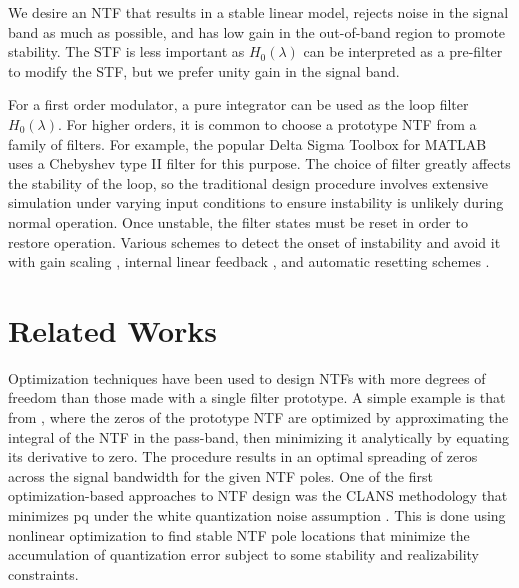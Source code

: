 We desire an \gls{NTF} that results in a stable linear model, rejects noise in the signal band as much as possible, and has low gain in the out-of-band region to promote stability. The \gls{STF} is less important as $H_0(\lambda)$ can be interpreted as a pre-filter to modify the \gls{STF}, but we prefer unity gain in the signal band.

For a first order modulator, a pure integrator can be used as the loop filter $H_0(\lambda)$. For higher orders, it is common to choose a prototype \gls{NTF} from a family of filters. For example, the popular Delta Sigma Toolbox for MATLAB \cite[Appx. B]{Schreier1997} uses a Chebyshev type II filter for this purpose. The choice of filter greatly affects the stability of the loop, so the traditional design procedure involves extensive simulation under varying input conditions to ensure instability is unlikely during normal operation. Once unstable, the filter states must be reset in order to restore operation. Various schemes to detect the onset of instability \cite{Wong2004} and avoid it with gain scaling \cite{Sooch1989}, internal linear feedback \cite{Moussavi1994}, and automatic resetting schemes \cite{Eynde1991}.

\section{Related Works}
\label{sec:in-rw}

Optimization techniques have been used to design \gls{NTF}s with more degrees of freedom than those made with a single filter prototype. A simple example is that from \cite[Sec. 4.3]{Schreier1997}, where the zeros of the prototype \gls{NTF} are optimized by approximating the integral of the \gls{NTF} in the pass-band, then minimizing it analytically by equating its derivative to zero. The procedure results in an optimal spreading of zeros across the signal bandwidth for the given \gls{NTF} poles. One of the first optimization-based approaches to \gls{NTF} design was the \gls{CLANS} methodology that minimizes \gls{pq} under the white quantization noise assumption \cite{Kenney1988}. This is done using nonlinear optimization to find stable \gls{NTF} pole locations that minimize the accumulation of quantization error subject to some stability and realizability constraints.


